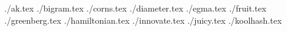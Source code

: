 \documentclass[11pt,letterpaper,oneside]{article}
\newcommand{\importproblem}[2]{{./#2.tex}}
\begin{document}
\importproblem{a}{ak}
\importproblem{b}{bigram}
\importproblem{c}{corns}
\importproblem{d}{diameter}
\importproblem{e}{egma}
\importproblem{f}{fruit}
\importproblem{g}{greenberg}
\importproblem{h}{hamiltonian}
\importproblem{i}{innovate}
\importproblem{j}{juicy}
\importproblem{k}{koolhash}
\end{document}
